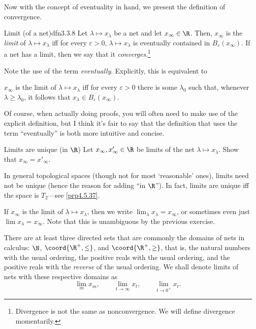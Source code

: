 Now with the concept of eventuality in hand, we present the definition of convergence.
\begin{dfn}{Limit (of a net)}{dfn3.3.8}
Let $\lambda \mapsto x_\lambda$ be a net and let $x_\infty\in \R$.  Then, $x_\infty$ is the \emph{limit} of $\lambda \mapsto x_\lambda$ iff for every $\varepsilon >0$, $\lambda \mapsto x_\lambda$ is eventually contained in $B_\varepsilon (x_\infty)$.   If a net has a limit, then we say that it \emph{converges}.\footnote{Divergence is not the same as nonconvergence.  We will define divergence momentarily.}
\begin{rmk}
Note the use of the term \emph{eventually}.  Explicitly, this is equivalent to
\begin{textequation}
$x_\infty$ is the limit of $\lambda \mapsto x_\lambda$ iff for every $\varepsilon >0$ there is some $\lambda _0$ such that, whenever $\lambda \geq \lambda _0$, it follows that $x_\lambda \in B_{\varepsilon}(x_\infty)$.
\end{textequation}
Of course, when actually doing proofs, you will often need to make use of the explicit definition, but I think it's fair to say that the definition that uses the term ``eventually'' is both more intuitive and concise.
\end{rmk}
\begin{exr}[breakable=false]{Limits are unique (in $\R$)}{}
Let $x_\infty,x'_\infty\in \R$ be limits of the net $\lambda \mapsto x_\lambda$.  Show that $x_\infty=x'_\infty$.
\begin{rmk}
In general topological spaces (though not for most `reasonable' ones), limits need not be unique (hence the reason for adding ``in $\R$'').  In fact, limits are unique iff the space is $T_2$---see \cref{prp4.5.37}.
\end{rmk}
\end{exr}
\begin{rmk}
If $x_\infty$ is the limit of $\lambda \mapsto x_\lambda$, then we write $\lim _\lambda x_\lambda =x_\infty$, or sometimes even just $\lim x_{\lambda}=x_{\infty}$.  Note that this is unambiguous by the previous exercise.
\end{rmk}
\begin{rmk}
There are at least three directed sets that are commonly the domains of nets in calculus:  $\N$, $\coord{\R ^+,\leq}$, and $\coord{\R ^+,\geq}$, that is, the natural numbers with the usual ordering, the positive reals with the usual ordering, and the positive reals with the \emph{reverse} of the usual ordering.  We shall denote limits of nets with these respective domains as
\begin{equation}
\lim _mx_m,\qquad \lim _{t\to \infty}x_t,\qquad \lim _{t\to 0^+}x_t.
\end{equation}
\end{rmk}
\end{dfn}
